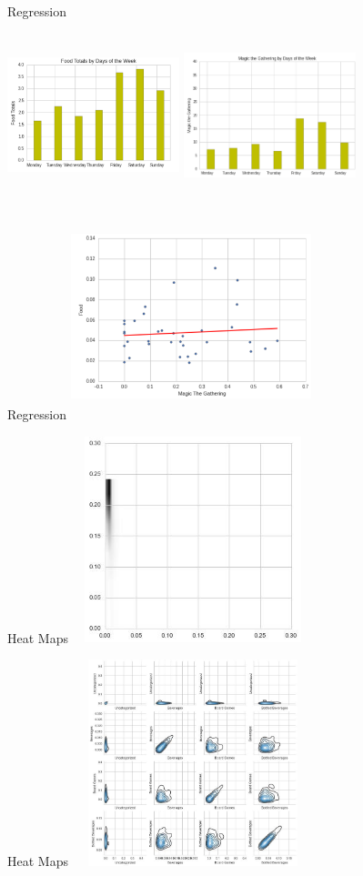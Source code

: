 \documentclass[compress,blue]{beamer}
\begin{document}
\begin{frame}{Regression}
\begin{columns}
\hspace{-5cm}
\column{}
\includegraphics[width=5cm,height=4cm]{FoodTotals}
\column{}
\includegraphics[width=5cm,height=4cm]{MTG}
\end{columns}
\end{frame}

\begin{frame}{Regression}
\includegraphics[width=7cm,height=6cm]{MTGandFoodRegression}
\end{frame}

\begin{frame}{Heat Maps}
\includegraphics[width=7cm,height=6cm]{FoodandCandy}
\end{frame}

\begin{frame}{Heat Maps}
\includegraphics[width=7cm,height=6cm]{Cool}
\end{frame}
\end{document}
